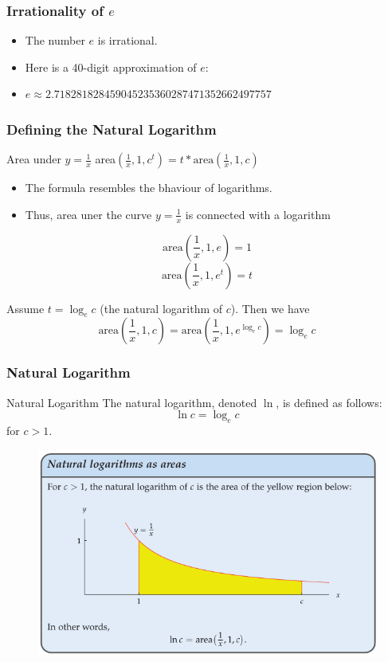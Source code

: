 \documentclass{beamer}
\begin{document}
\begin{frame}
  \frametitle{Irrationality of \(e\)}
  \begin{itemize}
    \item The number \(e\) is irrational.
    \item Here is a 40-digit approximation of \(e\):
    \item \(e \approx 2.718281828459045235360287471352662497757\)
  \end{itemize}
\end{frame}

\begin{frame}
  \frametitle{Defining the Natural Logarithm}
  \begin{block}{Area under \(y = \frac{1}{x}\)}
      area\((\frac{1}{x},1,c^{t}) = t*\text{area}(\frac{1}{x},1,c) \)
  \end{block}
  \begin{itemize}
    \item The formula resembles the bhaviour of logarithms.
    \item Thus, area uner the curve \(y = \frac{1}{x}\) is connected with a logarithm
  \end{itemize}
  \[\text{area}(\frac{1}{x},1,e) = 1 \]
\[\text{area}(\frac{1}{x},1,e^{t}) = t \]

Assume \(t = \log_e c\) (the natural logarithm of \(c\)). Then we have
\[\text{area}(\frac{1}{x},1,c) = \text{area}(\frac{1}{x},1,e^{\log_e c}) = \log_e c\]  
\end{frame}


\begin{frame}
  \frametitle{Natural Logarithm}
  
      \begin{block}{Natural Logarithm}
        The natural logarithm, denoted \(\ln\), is defined as follows:
        \[
          \ln c = \log_e c
        \]
        for \(c > 1\).
      \end{block}
      \begin{figure}
        \centering
        \includegraphics[scale=0.35]{e_5.png}
      \end{figure}
\end{frame}
\end{document}
